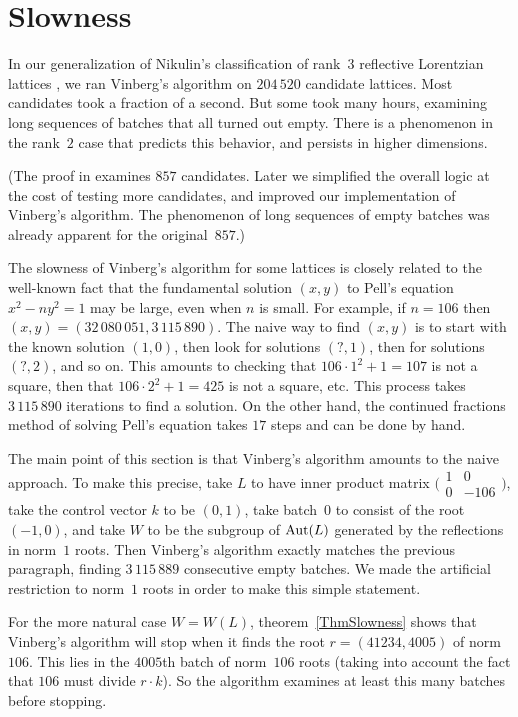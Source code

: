\documentclass[12pt]{amsart}
\def\Aut{\mathop{\rm Aut}\nolimits}
\def\twobytwo#1#2#3#4{\bigl(\begin{smallmatrix}#1&#2\\#3&#4\end{smallmatrix}\bigr)
    }
\numberwithin{theorem}{section}
\numberwithin{equation}{section}
\numberwithin{figure}{section}
\theoremstyle{remark}
\begin{document}
\section{Slowness}
\label{SecSlowness}

\noindent
In our generalization \cite{AllcockRank3} of 
Nikulin's classification of rank~$3$
reflective Lorentzian lattices 
\cite[I]{NikulinRank3}, we ran Vinberg's algorithm on
$204\,520$ candidate lattices.  Most candidates took a fraction of a second.
But some took many hours, examining long sequences of batches that all
turned out empty.
There is a phenomenon in the rank~$2$ case that predicts this behavior,
and persists in higher dimensions.

(The proof in \cite{AllcockRank3} examines $857$
candidates.  Later we simplified the overall logic at the cost of
testing more candidates, and improved our implementation of Vinberg's
algorithm.  The phenomenon of long sequences of empty batches was
already apparent for the original~$857$.)

The slowness of Vinberg's algorithm for some lattices
is closely related to the well-known fact that the fundamental solution
$(x,y)$ to Pell's equation $x^2-ny^2=1$ may be large, even  when $n$ is
small.  For example, if $n=106$ then 
$(x,y)=( 32\,080\,051 ,3\,115\,890)$.
The naive 
way to find $(x,y)$ is to start with the known solution
$(1,0)$, then look for solutions $(?,1)$, then for solutions $(?,2)$,
and so on.  This amounts to checking that $106\cdot1^2+1=107$ is not a square,
then that $106\cdot2^2+1=425$ is not a square, etc.  This process
takes  $3\,115\,890$
iterations to find a solution.  On the other hand, the continued fractions
method of solving
Pell's equation takes $17$ steps and can be
done by hand.

The main point of this section is that Vinberg's algorithm 
amounts to the naive approach.
To make this precise, take $L$ to have inner product matrix $\twobytwo{1}{0}{0}{-106}$,
take the control vector $k$ to be $(0,1)$, take batch~$0$ to consist
of the root $(-1,0)$, and take $W$ to be the
subgroup of $\Aut(L)$ generated by the reflections in norm~$1$ roots.
Then Vinberg's algorithm exactly matches the previous paragraph, finding
$3\,115\,889$ consecutive empty batches.
We made the artificial restriction to norm~$1$ roots in order to
make this simple statement.

For the more natural case $W=W(L)$,  theorem~\ref{ThmSlowness} 
shows that Vinberg's algorithm
will stop 
when it finds the  root $r=(41234, 4005)$ of norm~$106$.
This lies in the $4005$th batch
of norm~$106$ roots (taking into account the fact that $106$ must
divide $r\cdot k$).  
So the algorithm examines
at least this many batches before stopping.
\end{document}
